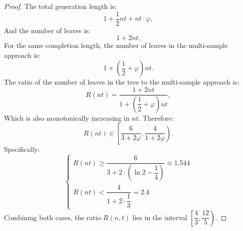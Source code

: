 \begin{proof}
The total generation length is:
\[
1 + \frac{1}{2} n t + n t \cdot \varphi,
\]
And the number of leaves is:
\[
1 + 2 n t.
\]
For the same completion length, the number of leaves in the multi-sample approach is:
\[
1 + \left(\frac{1}{2} + \varphi\right) n t.
\]
The ratio of the number of leaves in the tree to the multi-sample approach is:
\[
R(nt) = \frac{1 + 2 n t}{1 + \left(\dfrac{1}{2} + \varphi\right) n t},
\]
Which is also monotonically increasing in $nt$. Therefore:
\[
R(nt) \in \left[\dfrac{6}{3 + 2\varphi}, \dfrac{4}{1 + 2\varphi}\right).
\]
Specifically:
\[
\begin{cases}
    R(nt)\geq \dfrac{6}{3+2\cdot \left(\ln 2-\dfrac{1}{4}\right)}\approx 1.544 
    \\ R(nt)<\dfrac{4}{1+2\cdot \dfrac{1}{3}}=2.4
\end{cases}
\]
Combining both cases, the ratio $R(n, t)$ lies in the interval $\left[\dfrac{4}{3}, \dfrac{12}{5}\right)$.

\end{proof}

